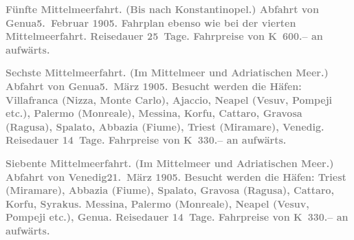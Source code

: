 \pstart
           \textcolor{gray}{\textbf{\textbf{Fünfte Mittelmeerfahrt.}
                  (Bis nach Konstantinopel.) Abfahrt von Genua\textbf{5. Februar 1905}. Fahrplan ebenso wie bei der vierten Mittelmeerfahrt. Reisedauer 25 Tage. Fahrpreise von \textbf{K 600.–} an aufwärts.}}\pend
           
\pstart
           \textcolor{gray}{\textbf{\textbf{Sechste Mittelmeerfahrt.} (Im Mittelmeer und Adriatischen Meer.) Abfahrt von Genua\textbf{5. März 1905}. Besucht werden die Häfen: Villafranca
                     (Nizza, Monte Carlo), Ajaccio, Neapel (Vesuv, Pompeji etc.), Palermo (Monreale), Messina, Korfu, Cattaro, Gravosa (Ragusa), Spalato, Abbazia (Fiume), Triest (Miramare), Venedig.
                  Reisedauer 14 Tage. Fahrpreise von \textbf{K 330.–} an aufwärts.}}\pend
           
\pstart
           \textcolor{gray}{\textbf{\textbf{Siebente Mittelmeerfahrt.} (Im Mittelmeer und Adriatischen Meer.) Abfahrt von Venedig\textbf{21. März 1905}. Besucht werden die Häfen: Triest (Miramare), Abbazia (Fiume), Spalato, Gravosa (Ragusa), Cattaro, Korfu, Syrakus. Messina,
                     Palermo (Monreale), Neapel (Vesuv, Pompeji etc.),
                     Genua. Reisedauer 14 Tage. Fahrpreise von
                     \textbf{K 330.–} an aufwärts.}}\pend
           
